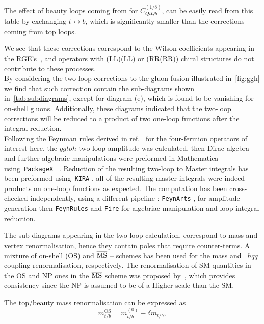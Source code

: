 The effect of beauty loops coming from for $ C_{QtQb}^{(1/8)}$, can be easily read from this table by exchanging $ t \leftrightarrow b$, which is significantly smaller than the corrections coming from top loops. 
\par We see that these corrections correspond to the Wilson coefficients appearing in the RGE's~, and operators with (LL)(LL) or (RR(RR)) chiral structures do not contribute to these processes. \\ By considering the two-loop corrections to the gluon fusion illustrated in~\autoref{fig:ggh} we find that such correction contain the sub-diagrams shown in~\autoref{tab:subdiagrams}, except for diagram (e), which is found to be vanishing for on-shell gluons. Additionally, these diagrams indicated that the two-loop corrections will be reduced to a product of two one-loop functions after the integral reduction. \\
Following the Feynman rules derived in ref.~\cite{Dedes:2017zog} for the four-fermion operators of interest here, the $ gg to h$ two-loop amplitude was calculated, then Dirac algebra and further algebraic manipulations were preformed in Mathematica using~\texttt{PackageX}~ \cite{Patel:2015tea}. Reduction of the resulting two-loop to Master integrals has been preformed using~\texttt{KIRA} \cite{Maierhoefer:2017hyi}, all of the resulting master integrals were indeed products on one-loop functions as expected. The computation has been cross-checked independently, using a different pipeline : \texttt{FeynArts} \cite{Hahn:2000kx}, for amplitude generation then  \texttt{FeynRules} \cite{Alloul:2013bka}  and  \texttt{Fire} \cite{Smirnov:2008iw} for algebriac manipulation and loop-integral reduction. \\
\par
The sub-diagrams appearing in the two-loop calculation, correspond to mass and vertex renormalisation, hence they contain poles that require counter-terms. A mixture of on-shell (OS) and $\overline{\mathrm{MS}}$ -- schemes has been used for the mass and ~$h q \bar{q}$ coupling renormalisation, respectively. The renormalisation of SM quantities in the OS and NP ones in the $\overline{\mathrm{MS}}$ scheme was proposed by~\cite{Dawson:2018pyl}, which provides consistency since the NP is assumed to be of a Higher scale than the SM. 
	\par The top/beauty mass renormalisation can be expressed as  
	\begin{equation}
		m_{t/b}^{\text{OS}}=m_{t/b}^{(0)}-\delta m_{t/b},
	\end{equation}
